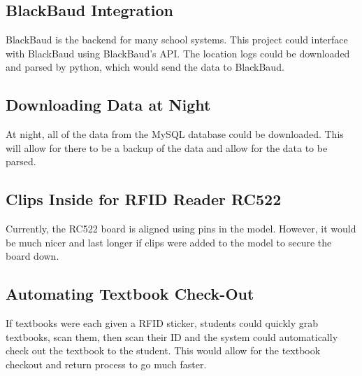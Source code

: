 \documentclass[12pt]{article}
\begin{document}
\begin{spacing}{1.2}
\subsection{BlackBaud Integration}

BlackBaud is the backend for many school systems. This project could interface with BlackBaud using BlackBaud's API. The location logs could be downloaded and parsed by python, which would send the data to BlackBaud.

\subsection{Downloading Data at Night}

At night, all of the data from the MySQL database could be downloaded. This will allow for there to be a backup of the data and allow for the data to be parsed. 

\subsection{Clips Inside for RFID Reader RC522}

Currently, the RC522 board is aligned using pins in the model. However, it would be much nicer and last longer if clips were added to the model to secure the board down.

\subsection{Automating Textbook Check-Out}

If textbooks were each given a RFID sticker, students could quickly grab textbooks, scan them, then scan their ID and the system could automatically check out the textbook to the student. This would allow for the textbook checkout and return process to go much faster.


\end{spacing}
\end{document}
